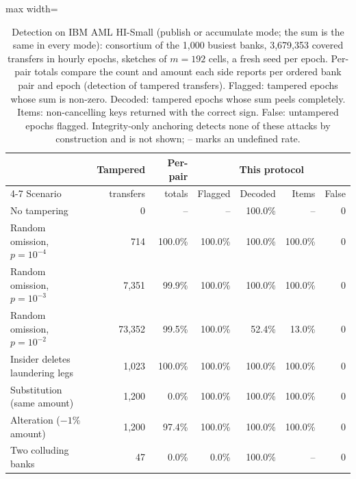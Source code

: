 \begin{table}[!htbp]\centering\small
\caption{Detection on IBM AML HI-Small (publish or accumulate mode; the sum is the same in every mode): consortium of the 1{,}000 busiest banks, 3{,}679{,}353 covered transfers in hourly epochs, sketches of $m=192$ cells, a fresh seed per epoch. Per-pair totals compare the count and amount each side reports per ordered bank pair and epoch (detection of tampered transfers). Flagged: tampered epochs whose sum is non-zero. Decoded: tampered epochs whose sum peels completely. Items: non-cancelling keys returned with the correct sign. False: untampered epochs flagged. Integrity-only anchoring detects none of these attacks by construction and is not shown; -- marks an undefined rate.}\label{tab:detection}
\begin{adjustbox}{max width=\linewidth}\begin{tabular}{lrrrrrr}\toprule
 & Tampered & Per-pair & \multicolumn{4}{c}{This protocol} \\\cmidrule(lr){4-7}
Scenario & transfers & totals & Flagged & Decoded & Items & False \\\midrule
No tampering & 0 & -- & -- & 100.0\% & -- & 0 \\
Random omission, $p=10^{-4}$ & 714 & 100.0\% & 100.0\% & 100.0\% & 100.0\% & 0 \\
Random omission, $p=10^{-3}$ & 7{,}351 & 99.9\% & 100.0\% & 100.0\% & 100.0\% & 0 \\
Random omission, $p=10^{-2}$ & 73{,}352 & 99.5\% & 100.0\% & 52.4\% & 13.0\% & 0 \\
Insider deletes laundering legs & 1{,}023 & 100.0\% & 100.0\% & 100.0\% & 100.0\% & 0 \\
Substitution (same amount) & 1{,}200 & 0.0\% & 100.0\% & 100.0\% & 100.0\% & 0 \\
Alteration ($-1\%$ amount) & 1{,}200 & 97.4\% & 100.0\% & 100.0\% & 100.0\% & 0 \\
Two colluding banks & 47 & 0.0\% & 0.0\% & 100.0\% & -- & 0 \\
\bottomrule\end{tabular}\end{adjustbox}\end{table}